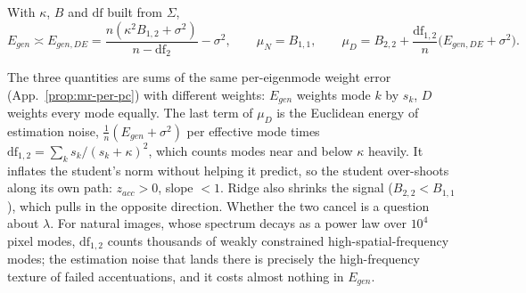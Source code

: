 \begin{prop}\label{prop:pixel-de}
With $\kappa$, $B$ and $\mathrm{df}$ built from $\Sigma$,
\begin{equation}
E_{gen}\asymp E_{gen,DE}=\frac{n(\kappa^2B_{1,2}+\sigma^2)}{n-\mathrm{df}_2}-\sigma^2,
\qquad
\mu_N=B_{1,1},
\qquad
\mu_D=B_{2,2}+\frac{\mathrm{df}_{1,2}}{n}\big(E_{gen,DE}+\sigma^2\big).
\label{eq:pixel-de}
\end{equation}
\end{prop}
The three quantities are sums of the same per-eigenmode weight error (App.~\ref{prop:mr-per-pc}) with different weights: $E_{gen}$ weights mode $k$ by $s_k$, $D$ weights every mode equally. The last term of $\mu_D$ is the Euclidean energy of estimation noise, $\frac1n(E_{gen}+\sigma^2)$ per effective mode times $\mathrm{df}_{1,2}=\sum_ks_k/(s_k+\kappa)^2$, which counts modes near and below $\kappa$ heavily. It inflates the student's norm without helping it predict, so the student over-shoots along its own path: $z_{acc}>0$, slope $<1$. Ridge also shrinks the signal ($B_{2,2}<B_{1,1}$), which pulls in the opposite direction. Whether the two cancel is a question about $\lambda$. For natural images, whose spectrum decays as a power law over $10^4$ pixel modes, $\mathrm{df}_{1,2}$ counts thousands of weakly constrained high-spatial-frequency modes; the estimation noise that lands there is precisely the high-frequency texture of failed accentuations, and it costs almost nothing in $E_{gen}$.

